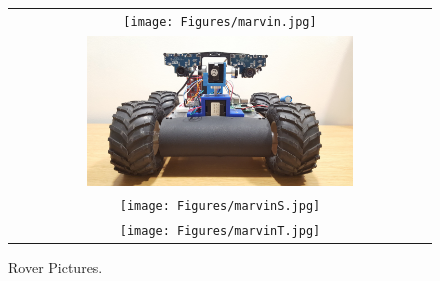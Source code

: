 \begin{figure}[H]
    \begin{center}
      \begin{tabular}{ c }
        \texttt{[image: Figures/marvin.jpg]} \\
        \includegraphics[width=0.65\textwidth]{Figures/marvinF.jpg} \\
        \texttt{[image: Figures/marvinS.jpg]} \\
        \texttt{[image: Figures/marvinT.jpg]}
      \end{tabular}
      \caption[Rover Pictures]{Rover Pictures.}
      \label{fig:marvin}
    \end{center}
\end{figure}